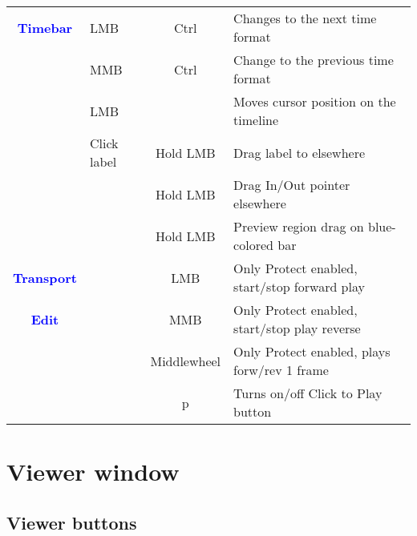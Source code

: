 \begin{center}
\begin{longtable}{ >{\bfseries}c l c p{6cm}}
        \midrule
        \textcolor{blue}{Timebar} & LMB & Ctrl & Changes to the next time format \\        
        & MMB & Ctrl & Change to the previous time format \\        
        & LMB &  & Moves cursor position on the timeline \\        
        & Click label & Hold LMB & Drag label to elsewhere \\        
        &  & Hold LMB & Drag In/Out pointer elsewhere \\        
        &  & Hold LMB & Preview region drag on blue-colored bar \\        
        \midrule        
        \textcolor{blue}{Transport} &  & LMB & Only Protect enabled, start/stop forward play \\
        \midrule
        \textcolor{blue}{Edit} &  & MMB & Only Protect enabled, start/stop play reverse \\        
        &  & Middlewheel & Only Protect enabled, plays forw/rev 1 frame \\        
        &  & p & Turns on/off Click to Play button \\
        
        \bottomrule  
    \end{longtable}
\end{center}

\section{Viewer window }%
\label{sec:viewer_window_shortcuts}

\subsection{Viewer buttons }%
\label{ssec:viewer_buttons}

